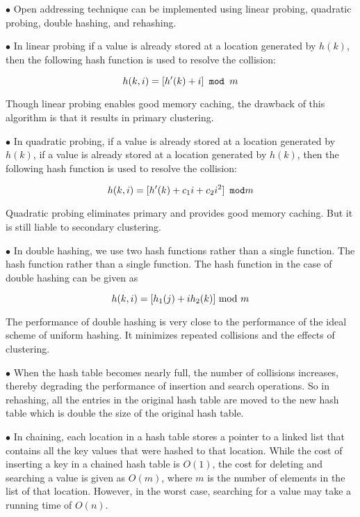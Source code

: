 \vskip 3mm
\qquad$\bullet$ Open addressing technique can be implemented using linear probing, quadratic probing, double hashing, and rehashing.

\vskip 3mm
\qquad$\bullet$ In linear probing if a value is already stored at a location generated by $h(k)$, then the following hash function is used to resolve the collision:

$$h(k,i)=[h'(k)+i]\hbox{\tt{} mod }m$$

Though linear probing enables good memory caching, the drawback of this algorithm is that it results in primary clustering.

\vskip 3mm
\qquad$\bullet$ In quadratic probing, if a value is already stored at a location generated by $h(k)$, if a value is already stored at a location generated by $h(k)$, then the following hash function is used to resolve the collision:

$$h(k,i)=[h'(k)+c_1i+c_2i^2]\hbox{\tt{} mod} m$$

Quadratic probing eliminates primary and provides good memory caching. But it is still liable to secondary clustering.

\vskip 3mm
\qquad$\bullet$ In double hashing, we use two hash functions rather than a single function. The hash function rather than a single function. The hash function in the case of double hashing can be given as

$$h(k,i)=[h_1(j)+ih_2(k)]\hbox{ mod }m$$

The performance of double hashing is very close to the performance of the ideal scheme of uniform hashing. It minimizes repeated collisions and the effects of clustering.

\vskip 3mm
\qquad$\bullet$ When the hash table becomes nearly full, the number of collisions increases, thereby degrading the performance of insertion and search operations. So in rehashing, all the entries in the original hash table are moved to the new hash table which is double the size of the original hash table.

\vskip 3mm
\qquad$\bullet$ In chaining, each location in a hash table stores a pointer to a linked list that contains all the key values that were hashed to that location. While the cost of inserting a key in a chained hash table is $O(1)$, the cost for deleting and searching a value is given as $O(m)$, where $m$ is the number of elements in the list of that location. However, in the worst case, searching for a value may take a running time of $O(n)$.


\vfill\eject
\bye

